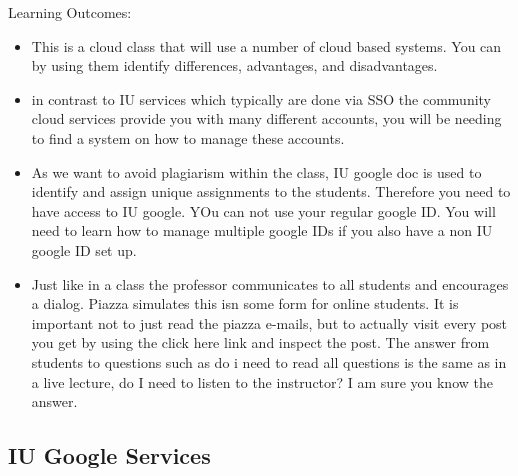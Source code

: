 Learning Outcomes:
\begin{itemize}
\item This is a cloud class that will use a number of cloud based
  systems. You can by using them identify differences, advantages, and
  disadvantages.
\item in contrast to IU services which typically are done via SSO the
  community cloud services provide you with many different accounts,
  you will be needing to find a system on how to manage these
  accounts.
\item As we want to avoid plagiarism within the class, IU google doc
  is used to identify and assign unique assignments to the
  students. Therefore you need to have access to IU google. YOu can
  not use your regular google ID. You will need to learn how to manage
  multiple google IDs if you also have a non IU google ID set up.
\item Just like in a class the professor communicates to all students
  and encourages a dialog. Piazza simulates this isn some form for
  online students. It is important not to just read the piazza
  e-mails, but to actually visit every post you get by using the click
  here link and inspect the post. The answer from students to
  questions such as do i need to read all questions is the same as in
  a live lecture, do I need to listen to the instructor? I am sure you
  know the answer.
\end{itemize}

\subsection{IU Google Services}
\label{E:e616-iu-google-services}

